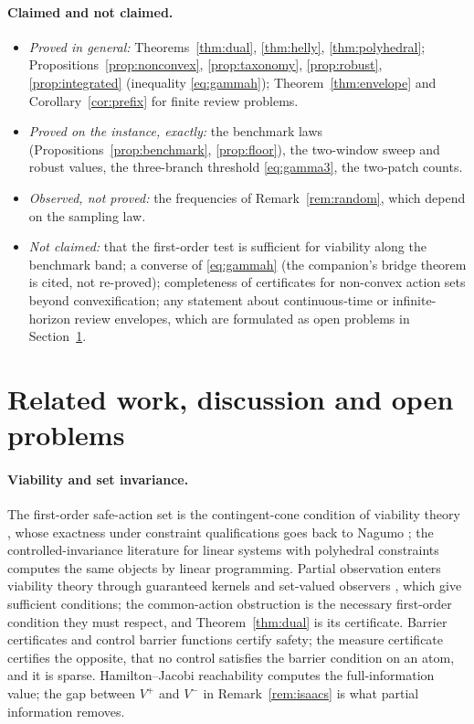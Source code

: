 \documentclass[11pt,a4paper]{article}
\theoremstyle{plain}
\theoremstyle{definition}
\theoremstyle{remark}
\begin{document}
\paragraph{Claimed and not claimed.}
\begin{itemize}[leftmargin=1.4em,itemsep=1pt]
\item \emph{Proved in general:} Theorems~\ref{thm:dual}, \ref{thm:helly}, \ref{thm:polyhedral}; Propositions~\ref{prop:nonconvex}, \ref{prop:taxonomy}, \ref{prop:robust}, \ref{prop:integrated} (inequality \eqref{eq:gammah}); Theorem~\ref{thm:envelope} and Corollary~\ref{cor:prefix} for finite review problems.
\item \emph{Proved on the instance, exactly:} the benchmark laws (Propositions~\ref{prop:benchmark}, \ref{prop:floor}), the two-window sweep and robust values, the three-branch threshold \eqref{eq:gamma3}, the two-patch counts.
\item \emph{Observed, not proved:} the frequencies of Remark~\ref{rem:random}, which depend on the sampling law.
\item \emph{Not claimed:} that the first-order test is sufficient for viability along the benchmark band; a converse of \eqref{eq:gammah} (the companion's bridge theorem is cited, not re-proved); completeness of certificates for non-convex action sets beyond convexification; any statement about continuous-time or infinite-horizon review envelopes, which are formulated as open problems in Section~\ref{sec:related}.
\end{itemize}
\section{Related work, discussion and open problems}\label{sec:related}

\paragraph{Viability and set invariance.} The first-order safe-action set is the contingent-cone condition of viability theory \cite{Aubin1991,Aubin2011}, whose exactness under constraint qualifications goes back to Nagumo \cite{Nagumo1942}; the controlled-invariance literature for linear systems with polyhedral constraints \cite{Blanchini1999} computes the same objects by linear programming. Partial observation enters viability theory through guaranteed kernels and set-valued observers \cite{Cardaliaguet2007}, which give sufficient conditions; the common-action obstruction is the necessary first-order condition they must respect, and Theorem~\ref{thm:dual} is its certificate. Barrier certificates \cite{PrajnaJadbabaie2004} and control barrier functions \cite{Ames2017} certify safety; the measure certificate certifies the opposite, that no control satisfies the barrier condition on an atom, and it is sparse. Hamilton--Jacobi reachability \cite{Mitchell2005} computes the full-information value; the gap between $V^+$ and $V^-$ in Remark~\ref{rem:isaacs} is what partial information removes.
\end{document}
